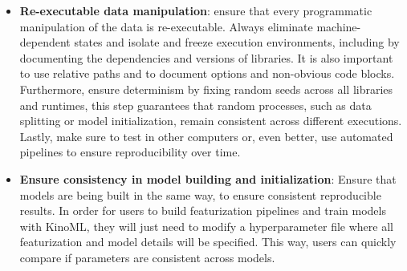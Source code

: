 \documentclass[9pt,lessons]{livecoms}
\begin{document}
\begin{itemize}



\item \textbf{Re-executable data manipulation}: ensure that every programmatic manipulation of the data is re-executable. Always eliminate machine-dependent states and isolate and freeze execution environments, including by documenting the dependencies and versions of libraries. It is also important to use relative paths and to document options and non-obvious code blocks. Furthermore, ensure determinism by fixing random seeds across all libraries and runtimes, this step guarantees that random processes, such as data splitting or model initialization, remain consistent across different executions. Lastly, make sure to test in other computers or, even better, use automated pipelines to ensure reproducibility over time.


\item\textbf{Ensure consistency in model building and initialization}: Ensure that models are being built in the same way, to ensure consistent reproducible results. In order for users to build featurization pipelines and train models with KinoML, they will just need to modify a hyperparameter file where all featurization and model details will be specified. This way, users can quickly compare if parameters are consistent across models.


\end{itemize}
\end{document}
